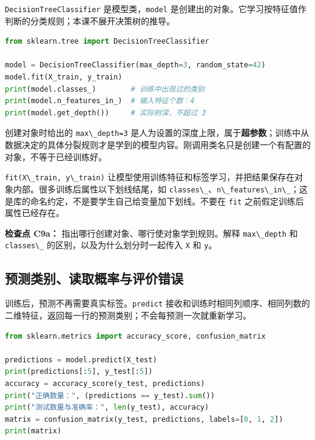 \documentclass[UTF8,a4paper,11pt,fontset=fandol]{ctexart}
\providecommand{\passthrough}[1]{#1}
\begin{document}
\passthrough{\lstinline!DecisionTreeClassifier!} 是模型类，\passthrough{\lstinline!model!} 是创建出的对象。它学习按特征值作判断的分类规则；本课不展开决策树的推导。

\begin{lstlisting}[language=Python]
from sklearn.tree import DecisionTreeClassifier

model = DecisionTreeClassifier(max_depth=3, random_state=42)
model.fit(X_train, y_train)
print(model.classes_)        # 训练中出现过的类别
print(model.n_features_in_)  # 输入特征个数：4
print(model.get_depth())     # 实际树深，不超过 3
\end{lstlisting}

创建对象时给出的 \passthrough{\lstinline!max\_depth=3!} 是人为设置的深度上限，属于\textbf{超参数}；训练中从数据决定的具体分裂规则才是学到的模型内容。刚调用类名只是创建一个有配置的对象，不等于已经训练好。

\passthrough{\lstinline!fit(X\_train, y\_train)!} 让模型使用训练特征和标签学习，并把结果保存在对象内部。很多训练后属性以下划线结尾，如 \passthrough{\lstinline!classes\_!}、\passthrough{\lstinline!n\_features\_in\_!}；这是库的命名约定，不是要学生自己给变量加下划线。不要在 \passthrough{\lstinline!fit!} 之前假定训练后属性已经存在。

\textbf{检查点 C9a：} 指出哪行创建对象、哪行使对象学到规则。解释 \passthrough{\lstinline!max\_depth!} 和 \passthrough{\lstinline!classes\_!} 的区别，以及为什么划分时一起传入 \passthrough{\lstinline!X!} 和 \passthrough{\lstinline!y!}。

\clearpage

\subsection{预测类别、读取概率与评价错误}\label{ux9884ux6d4bux7c7bux522bux8bfbux53d6ux6982ux7387ux4e0eux8bc4ux4ef7ux9519ux8bef}

训练后，预测不再需要真实标签。\passthrough{\lstinline!predict!} 接收和训练时相同列顺序、相同列数的二维特征，返回每一行的预测类别；不会每预测一次就重新学习。

\begin{lstlisting}[language=Python]
from sklearn.metrics import accuracy_score, confusion_matrix

predictions = model.predict(X_test)
print(predictions[:5], y_test[:5])
accuracy = accuracy_score(y_test, predictions)
print("正确数量：", (predictions == y_test).sum())
print("测试数量与准确率：", len(y_test), accuracy)
matrix = confusion_matrix(y_test, predictions, labels=[0, 1, 2])
print(matrix)
\end{lstlisting}
\end{document}
